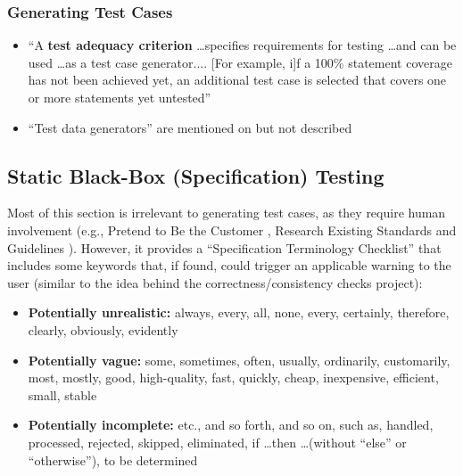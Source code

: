 \subsubsection{Generating Test Cases}

\begin{itemize}
      \item ``A \textbf{test adequacy criterion} \dots specifies requirements
            for testing \dots and can be used \dots as a test case generator....
                  [For example, i]f a 100\% statement coverage has not been achieved
            yet, an additional test case is selected that covers one or more
            statements yet untested'' \citep[p.~402]{vanVliet2000}
      \item ``Test data generators'' are mentioned on
            \citep[p.~410]{vanVliet2000} but not described
\end{itemize}

\subsection{Static Black-Box (Specification) Testing
      \citep[pp.~56-62]{Patton2006}}

Most of this section is irrelevant to generating test cases, as they require
human involvement  (e.g., Pretend to Be the Customer
\citep[pp.~57-58]{Patton2006}, Research Existing Standards and
Guidelines \citep[pp.~58-59]{Patton2006}). However, it provides a
``Specification Terminology Checklist'' \citep[p.~61]{Patton2006} that
includes some keywords that, if found, could trigger an applicable warning to
the user (similar to the idea behind the correctness/consistency checks
project):

\begin{itemize}
      \item \textbf{Potentially unrealistic:} always, every, all, none, every,
            certainly, therefore, clearly, obviously, evidently
      \item \textbf{Potentially vague:} some, sometimes, often, usually,
            ordinarily, customarily, most, mostly, good, high-quality, fast,
            quickly, cheap, inexpensive, efficient, small, stable
      \item \textbf{Potentially incomplete:} etc., and so forth, and so on,
            such as, handled, processed, rejected, skipped, eliminated,
            if \dots then \dots (without ``else'' or ``otherwise''),
            to be determined \citep[p.~408]{vanVliet2000}
\end{itemize}


